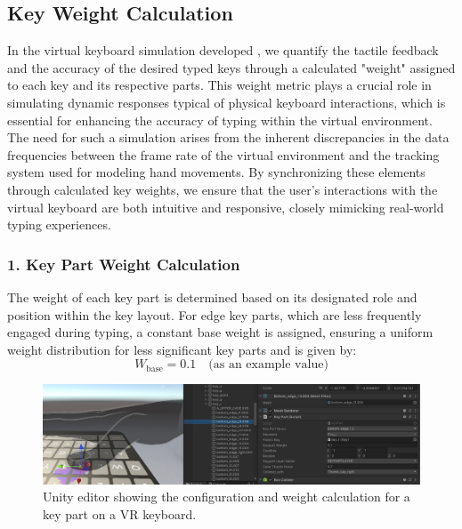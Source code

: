 \subsection{Key Weight Calculation}
In the virtual keyboard simulation developed , we quantify the tactile feedback and the accuracy of the desired typed keys through a calculated "weight" assigned to each key and its respective parts. This weight metric plays a crucial role in simulating dynamic responses typical of physical keyboard interactions, which is essential for enhancing the accuracy of typing within the virtual environment. The need for such a simulation arises from the inherent discrepancies in the data frequencies between the frame rate of the virtual environment and the tracking system used for modeling hand movements. By synchronizing these elements through calculated key weights, we ensure that the user's interactions with the virtual keyboard are both intuitive and responsive, closely mimicking real-world typing experiences.


\subsubsection*{1. Key Part Weight Calculation}
The weight of each key part is determined based on its designated role and position within the key layout. For edge key parts, which are less frequently engaged during typing, a constant base weight is assigned, ensuring a uniform weight distribution for less significant key parts and is given by:
\begin{equation}
W_{\text{base}} = 0.1 \quad \text{(as an example value)}
\end{equation}


\begin{figure}[h!]
    \centering
    \includegraphics[width=\linewidth]{Development/Edge_keypart.PNG}
    \caption{\centering Unity editor showing the configuration and weight calculation for a key part on a VR keyboard.}
\end{figure}


